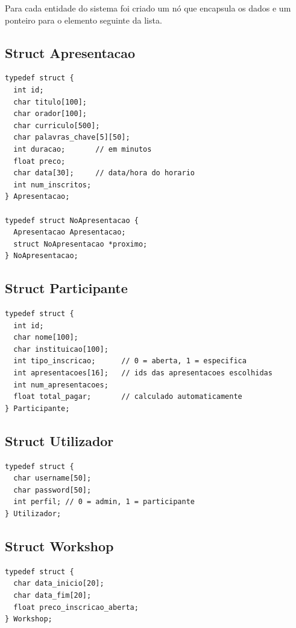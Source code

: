 \documentclass[12pt,a4paper]{article}
\begin{document}
Para cada entidade do sistema foi criado um nó que encapsula os dados e um ponteiro para o elemento seguinte da lista.

\subsection{Struct Apresentacao}

\begin{lstlisting}[style=cstyle, caption={Struct Apresentacao em apresentacao.h}]
typedef struct {
  int id;
  char titulo[100];
  char orador[100];
  char curriculo[500];
  char palavras_chave[5][50];
  int duracao;       // em minutos
  float preco;
  char data[30];     // data/hora do horario
  int num_inscritos;
} Apresentacao;

typedef struct NoApresentacao {
  Apresentacao Apresentacao;
  struct NoApresentacao *proximo;
} NoApresentacao;
\end{lstlisting}

\subsection{Struct Participante}

\begin{lstlisting}[style=cstyle, caption={Struct Participante em participante.h}]
typedef struct {
  int id;
  char nome[100];
  char instituicao[100];
  int tipo_inscricao;      // 0 = aberta, 1 = especifica
  int apresentacoes[16];   // ids das apresentacoes escolhidas
  int num_apresentacoes;
  float total_pagar;       // calculado automaticamente
} Participante;
\end{lstlisting}

\subsection{Struct Utilizador}

\begin{lstlisting}[style=cstyle, caption={Struct Utilizador em utilizador.h}]
typedef struct {
  char username[50];
  char password[50];
  int perfil; // 0 = admin, 1 = participante
} Utilizador;
\end{lstlisting}

\subsection{Struct Workshop}

\begin{lstlisting}[style=cstyle, caption={Struct Workshop em workshop.h}]
typedef struct {
  char data_inicio[20];
  char data_fim[20];
  float preco_inscricao_aberta;
} Workshop;
\end{lstlisting}
\end{document}

